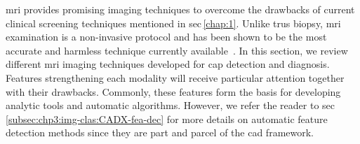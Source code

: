 
\ac{mri} provides promising imaging techniques to overcome the drawbacks of current clinical screening techniques mentioned in \acs{sec}\,\ref{chap:1}.
Unlike \ac{trus} biopsy, \ac{mri} examination is a non-invasive protocol and has been shown to be the most accurate and harmless technique currently available~\cite{Turkbey2012}.
In this section, we review different \ac{mri} imaging techniques developed for \ac{cap} detection and diagnosis.
Features strengthening each modality will receive particular attention together with their drawbacks.
Commonly, these features form the basis for developing analytic tools and automatic algorithms.
However, we refer the reader to \acs{sec}\,\ref{subsec:chp3:img-clas:CADX-fea-dec} for more details on automatic feature detection methods since they are part and parcel of the \acs{cad} framework.


